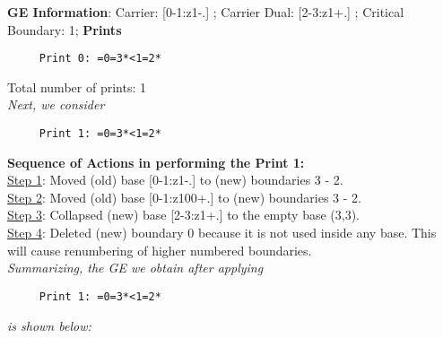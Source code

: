 \documentclass[final]{article}
\begin{document}
{\bf GE Information}:  
Carrier: [0-1:z1-.] ;  
Carrier Dual: [2-3:z1+.] ;  
Critical Boundary: 1;  
{\bf Prints}
\begin{verbatim}
     Print 0: =0=3*<1=2*
\end{verbatim}
Total number of prints: 1\\
{\em Next, we consider}
\begin{verbatim}
     Print 1: =0=3*<1=2*
\end{verbatim}
{\bf Sequence of Actions in performing the Print 1:}\\
{\underline{Step 1}:} Moved (old) base [0-1:z1-.]  to (new) boundaries 3 - 2.\\
{\underline{Step 2}:} Moved (old) base [0-1:z100+.]  to (new) boundaries 3 - 2.\\
{\underline{Step 3}:} Collapsed (new) base [2-3:z1+.]  to the empty base (3,3).
\\
{\underline{Step 4}:} Deleted (new) boundary 0 because it is not used inside any base.  This will cause renumbering of higher numbered boundaries.
\\[0.1in]
{\em Summarizing, the GE we obtain after applying}
\begin{verbatim}
     Print 1: =0=3*<1=2*
\end{verbatim}
{\em is shown below:}
\end{document}
